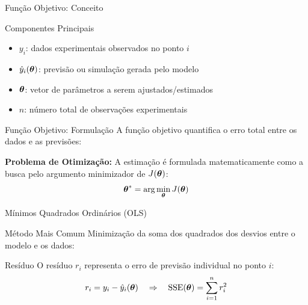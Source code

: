 \begin{frame}{Função Objetivo: Conceito}

\begin{block}{Componentes Principais}
\begin{itemize}
    \item $y_i$: dados experimentais observados no ponto $i$
    \item $\hat{y}_i(\boldsymbol{\theta})$: previsão ou simulação gerada pelo modelo
    \item $\boldsymbol{\theta}$: vetor de parâmetros a serem ajustados/estimados
    \item $n$: número total de observações experimentais
\end{itemize}
\end{block}
\end{frame}

\begin{frame}{Função Objetivo: Formulação}
A função objetivo quantifica o erro total entre os dados e as previsões:


\vspace{0.4cm}

\textbf{Problema de Otimização:}
A estimação é formulada matematicamente como a busca pelo argumento minimizador de $J(\boldsymbol{\theta})$:
\begin{equation*}
\boldsymbol{\theta}^* = \arg\min_{\boldsymbol{\theta}} J(\boldsymbol{\theta})
\end{equation*}
\end{frame}

\begin{frame}{Mínimos Quadrados Ordinários (OLS)}
\begin{block}{Método Mais Comum}
Minimização da soma dos quadrados dos desvios entre o modelo e os dados:
\end{block}


\vspace{0.2cm}
\begin{exampleblock}{Resíduo}
O resíduo $r_i$ representa o erro de previsão individual no ponto $i$:
\begin{equation*}
r_i = y_i - \hat{y}_i(\boldsymbol{\theta}) \quad \Rightarrow \quad \text{SSE}(\boldsymbol{\theta}) = \sum_{i=1}^{n} r_i^2
\end{equation*}
\end{exampleblock}
\end{frame}

